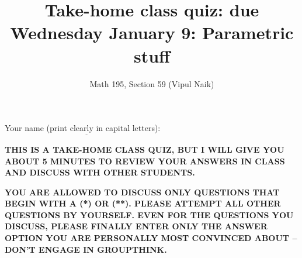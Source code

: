 \documentclass[10pt]{amsart}
\title{Take-home class quiz: due Wednesday January 9: Parametric stuff}
\author{Math 195, Section 59 (Vipul Naik)}
\begin{document}
\maketitle

Your name (print clearly in capital letters): $\underline{\qquad\qquad\qquad\qquad\qquad\qquad\qquad\qquad\qquad\qquad}$

\vspace{0.1in}

{\bf THIS IS A TAKE-HOME CLASS QUIZ, BUT I WILL GIVE YOU ABOUT 5
  MINUTES TO REVIEW YOUR ANSWERS IN CLASS AND DISCUSS WITH OTHER
  STUDENTS.}

\vspace{0.1in}

{\bf YOU ARE ALLOWED TO DISCUSS ONLY QUESTIONS THAT BEGIN WITH A (*)
  OR (**). PLEASE ATTEMPT ALL OTHER QUESTIONS BY YOURSELF. EVEN FOR THE QUESTIONS YOU DISCUSS, PLEASE FINALLY ENTER ONLY THE ANSWER OPTION YOU ARE PERSONALLY MOST CONVINCED ABOUT -- DON'T ENGAGE IN GROUPTHINK.}
\end{document}
